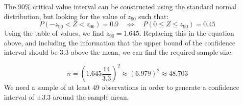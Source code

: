 \documentclass[a4paper, leqno, 12pt]{article} %
\newenvironment{top_enumerate}{
\begin{enumerate}
  \setlength{\itemsep}{2em}
  \setlength{\topsep}{-0pt}
  \setlength{\partopsep}{-0pt}
}{\end{enumerate}}
\begin{document}
\begin{top_enumerate}
\begin{enumerate}
	The {90}\% critical value interval can be constructed using the standard normal distribution, but looking for the value of $z_{{90}}$ such that:
	\[
	P(-z_{{90}} < Z < z_{{90}}) = {0.9} \quad \iff \quad P(0 \le Z \le z_{{90}}) = {0.45}
	\]
	Using the table of values, we find $z_{{90}} = {1.645}$. Replacing this in the equation above, and including the information that the upper bound of the confidence interval should be {3.3} above the mean, we can find the required sample size.
	
	\[
	n = \left({1.645} \frac{{14}}{{3.3}}\right)^2 \approx \left({6.979}\right)^2 \approx {48.703}
	\]
	We need a sample of at least {49} observations in order to generate a confidence interval of $\pm${3.3} around the sample mean.
	 \quad \textbf{}
\end{enumerate}\newpage


\end{top_enumerate}

\bigskip
\section*{}
\end{document}
